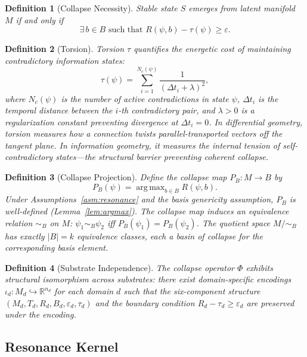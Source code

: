 \documentclass[11pt]{article}
\theoremstyle{plain}
\newtheorem{definition}{Definition}[section]
\DeclareMathOperator*{\argmax}{arg\,max}
\begin{document}
\begin{definition}[Collapse Necessity]
Stable state $S$ emerges from latent manifold $M$ if and only if
\[
  \exists\, b \in B \text{ such that } R(\psi, b) - \tau(\psi) \geq \varepsilon.
\]
\end{definition}

\begin{definition}[Torsion]
Torsion $\tau$ quantifies the energetic cost of maintaining contradictory information states:
\begin{equation}\label{eq:torsion}
  \tau(\psi) = \sum_{i=1}^{N_c(\psi)} \frac{1}{(\Delta t_i + \lambda)^2},
\end{equation}
where $N_c(\psi)$ is the number of active contradictions in state $\psi$, $\Delta t_i$ is the
temporal distance between the $i$-th contradictory pair, and $\lambda > 0$ is a regularization
constant preventing divergence at $\Delta t_i = 0$. In differential geometry, torsion measures how
a connection twists parallel-transported vectors off the tangent plane. In information geometry, it
measures the internal tension of self-contradictory states---the structural barrier preventing
coherent collapse.
\end{definition}

\begin{definition}[Collapse Projection]
Define the collapse map $P_B : M \to B$ by
\[
  P_B(\psi) = \argmax_{b \in B} R(\psi, b).
\]
Under Assumptions~\ref{asm:resonance} and the basis genericity assumption, $P_B$ is well-defined
(Lemma~\ref{lem:argmax}). The collapse map induces an equivalence relation $\sim_B$ on $M$:
$\psi_1 \sim_B \psi_2$ iff $P_B(\psi_1) = P_B(\psi_2)$. The quotient space $M/{\sim_B}$ has exactly
$|B| = k$ equivalence classes, each a basin of collapse for the corresponding basis element.
\end{definition}

\begin{definition}[Substrate Independence]
The collapse operator $\Phi$ exhibits structural isomorphism across substrates: there exist
domain-specific encodings $\iota_d : M_d \hookrightarrow \mathbb{R}^{n_d}$ for each domain $d$ such
that the six-component structure $(M_d, T_d, R_d, B_d, \varepsilon_d, \tau_d)$ and the boundary
condition $R_d - \tau_d \geq \varepsilon_d$ are preserved under the encoding.
\end{definition}

\subsection{Resonance Kernel}
\end{document}
